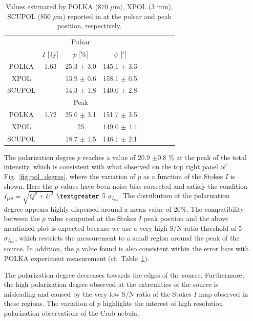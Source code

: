 \documentclass[twocolumn,traditabstract]{aa}
\begin{document}
\begin{table}
  \centering
      \begin{tabular}{ccccccccc}
      \hline
      \hline
      & &  Pulsar & & \\
       & $I$ [Jy]& $p$ [\%] & $\psi$ [$^\circ$] & \\ 
       \hline
      POLKA & 1.63 & 25.3 $\pm$ 3.0 & 145.1 $\pm$ 3.3 & \\
      XPOL  &  & 13.9 $\pm$ 0.6 & 158.1 $\pm$ 0.5 &  \\
      SCUPOL & & 14.3 $\pm$ 1.8 & 140.0 $\pm$ 2.8& \\
      \hline
      \hline
       & &  Peak & & \\
       \hline
      POLKA & 1.72 & 25.0 $\pm$ 3.1 & 151.7 $\pm$ 3.5 &  \\
      XPOL  & & 25 & 149.0 $\pm $ 1.4 &  \\
      SCUPOL & & 18.7 $\pm$ 1.5 & 146.1 $\pm$ 2.1&\\
     \hline            
    \hline   
    \end{tabular}
   \caption{ Values estimated by POLKA (870 $\mu$m), XPOL (3 mm), SCUPOL (850 $\mu$m) reported in \cite{2014PASP..126.1027W} at the pulsar and peak position, respectively. }
\label{tab:peak_pulsar_others}
 \end{table}


The polarization degree $p$ reaches a value of 20.9 $\pm$0.8 \% at
the peak of the total intensity, which is consistent with what observed on the
top right panel of Fig.~\ref{fig:pol_degree}, where the variation of $p$ as a
function of the Stokes $I$ is shown.  Here the $p$ values have been noise bias
corrected and satisfy the condition $I_{pol}=\sqrt{Q^2+U^2}$ $\textgreater$ 5
$\sigma_{I_{pol}}$. The distribution of the polarization degree appears highly
dispersed around a mean value of 20\%.  The compatibility between the $p$ value
computed at the Stokes $I$ peak position and the above mentioned plot is
expected because we use a very high S/N ratio threshold of 5 $\sigma_{I_{pol}}$,
which restricts the measurement to a small region around the peak of the source.
In addition, the $p$ value found is also consistent within the error bars with
POLKA experiment measurement \citep{2014PASP..126.1027W} (cf.~Table~\ref{tab:peak_pulsar_others}).

The polarization degree decreases towards the edges of the
source. Furthermore, the high polarization degree observed at the extremities of the source is misleading and caused by the very low S/N ratio of the Stokes $I$ map observed in these regions. The variation of $p$ highlights the interest of high resolution polarization
observations of the Crab nebula. 
\end{document}
